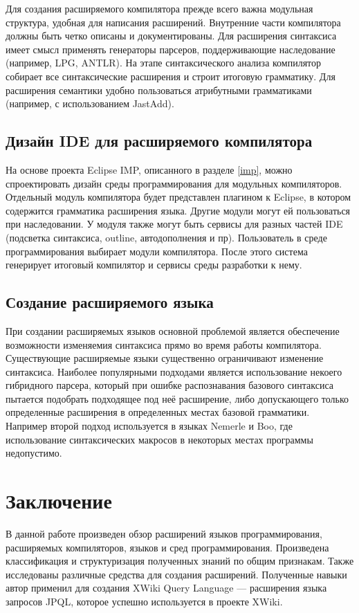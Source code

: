 \documentclass[a4paper,12pt,titlepage]{extarticle}
\begin{document}
Для создания расширяемого компилятора прежде всего важна модульная структура,
удобная для написания расширений. Внутренние части компилятора должны быть
четко описаны и документированы.
Для расширения синтаксиса имеет смысл применять генераторы парсеров,
поддерживающие наследование (например, LPG, ANTLR).
На этапе синтаксического анализа компилятор собирает все синтаксические
расширения и строит итоговую грамматику.
Для расширения семантики удобно пользоваться атрибутными грамматиками
(например, с использованием JastAdd).

\subsection{Дизайн IDE для расширяемого компилятора}

На основе проекта Eclipse IMP, описанного в разделе \ref{imp}, можно
спроектировать дизайн среды программирования для модульных компиляторов.
Отдельный модуль компилятора будет представлен плагином к Eclipse, в котором
содержится грамматика расширения языка. Другие модули могут ей
пользоваться при наследовании. У модуля также могут быть сервисы для разных
частей IDE (подсветка синтаксиса, outline, автодополнения и пр).
Пользователь в среде программирования выбирает модули компилятора. После этого
система генерирует итоговый компилятор и сервисы среды разработки к нему.

\subsection{Создание расширяемого языка}

При создании расширяемых языков основной проблемой является
обеспечение возможности изменяемия синтаксиса прямо во время работы
компилятора.
Существующие расширяемые языки существенно ограничивают изменение синтаксиса.
Наиболее популярными подходами является использование некоего
гибридного парсера, который при ошибке распознавания базового синтаксиса
пытается подобрать подходящее под неё расширение, либо допускающего только
определенные расширения в определенных местах базовой грамматики. Например
второй подход используется в языках Nemerle и Boo, где
использование синтаксических макросов в некоторых местах программы недопустимо.

\section{Заключение}

В данной работе произведен обзор расширений языков программирования,
расширяемых компиляторов, языков и сред программирования. Произведена
классификация и структуризация полученных знаний по общим признакам.  Также
исследованы различные средства для создания расширений.
Полученные навыки автор применил для создания XWiki Query
Language\cite{xwql} --- расширения языка запросов JPQL, которое успешно
используется в проекте XWiki.

\small



\end{document}

